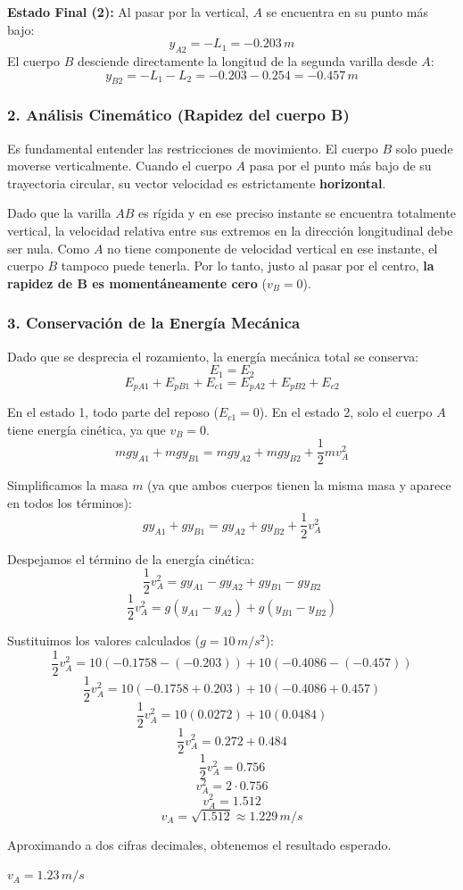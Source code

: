 \documentclass[12pt, a4paper]{article}
\begin{document}
\textbf{Estado Final (2):}
Al pasar por la vertical, $A$ se encuentra en su punto más bajo:
$$ y_{A2} = -L_1 = -0.203 \, \si{m} $$
El cuerpo $B$ desciende directamente la longitud de la segunda varilla desde $A$:
$$ y_{B2} = -L_1 - L_2 = -0.203 - 0.254 = -0.457 \, \si{m} $$

\subsubsection*{2. Análisis Cinemático (Rapidez del cuerpo B)}
Es fundamental entender las restricciones de movimiento. El cuerpo $B$ solo puede moverse verticalmente. Cuando el cuerpo $A$ pasa por el punto más bajo de su trayectoria circular, su vector velocidad es estrictamente \textbf{horizontal}.

Dado que la varilla $AB$ es rígida y en ese preciso instante se encuentra totalmente vertical, la velocidad relativa entre sus extremos en la dirección longitudinal debe ser nula. Como $A$ no tiene componente de velocidad vertical en ese instante, el cuerpo $B$ tampoco puede tenerla. Por lo tanto, justo al pasar por el centro, \textbf{la rapidez de B es momentáneamente cero} ($v_B = 0$).

\subsubsection*{3. Conservación de la Energía Mecánica}
Dado que se desprecia el rozamiento, la energía mecánica total se conserva:
$$ E_1 = E_2 $$
$$ E_{pA1} + E_{pB1} + E_{c1} = E_{pA2} + E_{pB2} + E_{c2} $$

En el estado 1, todo parte del reposo ($E_{c1} = 0$). En el estado 2, solo el cuerpo $A$ tiene energía cinética, ya que $v_B = 0$.
$$ m g y_{A1} + m g y_{B1} = m g y_{A2} + m g y_{B2} + \frac{1}{2} m v_A^2 $$

Simplificamos la masa $m$ (ya que ambos cuerpos tienen la misma masa y aparece en todos los términos):
$$ g y_{A1} + g y_{B1} = g y_{A2} + g y_{B2} + \frac{1}{2} v_A^2 $$

Despejamos el término de la energía cinética:
$$ \frac{1}{2} v_A^2 = g y_{A1} - g y_{A2} + g y_{B1} - g y_{B2} $$
$$ \frac{1}{2} v_A^2 = g (y_{A1} - y_{A2}) + g (y_{B1} - y_{B2}) $$

Sustituimos los valores calculados ($g = 10 \, \si{m/s^2}$):
$$ \frac{1}{2} v_A^2 = 10 (-0.1758 - (-0.203)) + 10 (-0.4086 - (-0.457)) $$
$$ \frac{1}{2} v_A^2 = 10 (-0.1758 + 0.203) + 10 (-0.4086 + 0.457) $$
$$ \frac{1}{2} v_A^2 = 10 (0.0272) + 10 (0.0484) $$
$$ \frac{1}{2} v_A^2 = 0.272 + 0.484 $$
$$ \frac{1}{2} v_A^2 = 0.756 $$
$$ v_A^2 = 2 \cdot 0.756 $$
$$ v_A^2 = 1.512 $$
$$ v_A = \sqrt{1.512} \approx 1.229 \, \si{m/s} $$

Aproximando a dos cifras decimales, obtenemos el resultado esperado.

\begin{tcolorbox}[colback=green!5!white, colframe=green!50!black, title=Respuesta Final]
\centering \Large $v_A = 1.23 \, \si{m/s}$
\end{tcolorbox}
\end{document}
